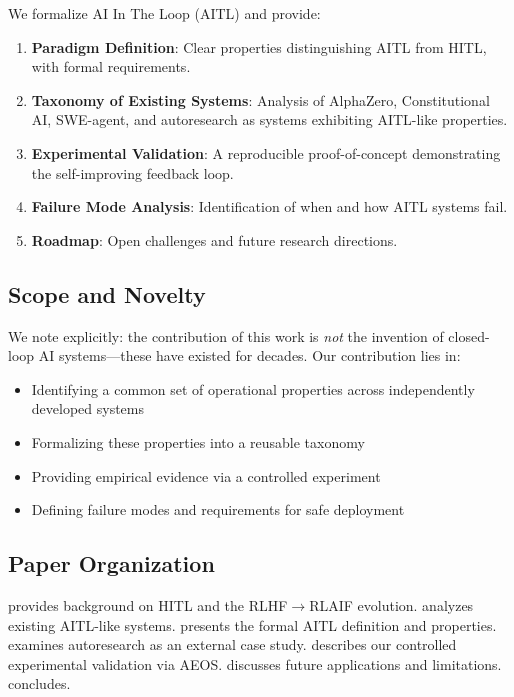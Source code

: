 \documentclass[11pt]{article}
\begin{document}
We formalize AI In The Loop (AITL) and provide:

\begin{enumerate}[nosep]
  \item \textbf{Paradigm Definition}: Clear properties distinguishing AITL from HITL, with formal requirements.
  \item \textbf{Taxonomy of Existing Systems}: Analysis of AlphaZero, Constitutional AI, SWE-agent, and autoresearch as systems exhibiting AITL-like properties.
  \item \textbf{Experimental Validation}: A reproducible proof-of-concept demonstrating the self-improving feedback loop.
  \item \textbf{Failure Mode Analysis}: Identification of when and how AITL systems fail.
  \item \textbf{Roadmap}: Open challenges and future research directions.
\end{enumerate}

\subsection{Scope and Novelty}

We note explicitly: the contribution of this work is \emph{not} the invention of closed-loop AI systems---these have existed for decades. Our contribution lies in:

\begin{itemize}[nosep]
  \item Identifying a common set of operational properties across independently developed systems
  \item Formalizing these properties into a reusable taxonomy
  \item Providing empirical evidence via a controlled experiment
  \item Defining failure modes and requirements for safe deployment
\end{itemize}

\subsection{Paper Organization}

 provides background on HITL and the RLHF$\to$RLAIF evolution.  analyzes existing AITL-like systems.  presents the formal AITL definition and properties.  examines autoresearch as an external case study.  describes our controlled experimental validation via AEOS.  discusses future applications and limitations.  concludes.
\end{document}
